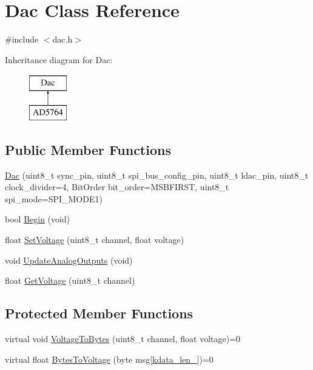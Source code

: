 \hypertarget{classDac}{}\section{Dac Class Reference}
\label{classDac}


{\ttfamily \#include $<$dac.\+h$>$}

Inheritance diagram for Dac\+:\begin{figure}[H]
\begin{center}
\leavevmode
\includegraphics[height=2.000000cm]{classDac}
\end{center}
\end{figure}
\subsection*{Public Member Functions}
\begin{DoxyCompactItemize}
\item 
\mbox{\hyperlink{classDac_ae74afbc4c82a8acbd8c74dcf4ea046ba}{Dac}} (uint8\+\_\+t sync\+\_\+pin, uint8\+\_\+t spi\+\_\+bus\+\_\+config\+\_\+pin, uint8\+\_\+t ldac\+\_\+pin, uint8\+\_\+t clock\+\_\+divider=4, Bit\+Order bit\+\_\+order=M\+S\+B\+F\+I\+R\+ST, uint8\+\_\+t spi\+\_\+mode=S\+P\+I\+\_\+\+M\+O\+D\+E1)
\item 
bool \mbox{\hyperlink{classDac_ad88e0048e59c0633b72769ddb8337e49}{Begin}} (void)
\item 
float \mbox{\hyperlink{classDac_a004482673b235eddc8100befac4a6833}{Set\+Voltage}} (uint8\+\_\+t channel, float voltage)
\item 
void \mbox{\hyperlink{classDac_aafef1707ec33a2166a69e9b646cd471b}{Update\+Analog\+Outputs}} (void)
\item 
float \mbox{\hyperlink{classDac_a55688546d527c42ebf48a12204e69731}{Get\+Voltage}} (uint8\+\_\+t channel)
\end{DoxyCompactItemize}
\subsection*{Protected Member Functions}
\begin{DoxyCompactItemize}
\item 
virtual void \mbox{\hyperlink{classDac_af5e882c87d38e1580d1b046ffd9effa0}{Voltage\+To\+Bytes}} (uint8\+\_\+t channel, float voltage)=0
\item 
virtual float \mbox{\hyperlink{classDac_a1dc9be97cb41ddacbd8dde0c5d4243b4}{Bytes\+To\+Voltage}} (byte msg\mbox{[}\mbox{\hyperlink{classDac_af3de0bf669183e66ebf916f8c685fe6b}{kdata\+\_\+len\+\_\+}}\mbox{]})=0
\end{DoxyCompactItemize}
